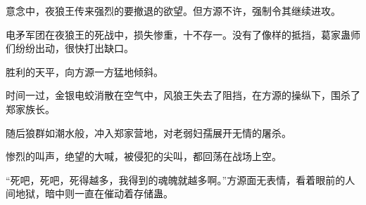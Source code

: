 \begin{this_body}
意念中，夜狼王传来强烈的要撤退的欲望。但方源不许，强制令其继续进攻。

电矛军团在夜狼王的死战中，损失惨重，十不存一。没有了像样的抵挡，葛家蛊师们纷纷出动，很快打出缺口。

胜利的天平，向方源一方猛地倾斜。

时间一过，金银电蛟消散在空气中，风狼王失去了阻挡，在方源的操纵下，围杀了郑家族长。

随后狼群如潮水般，冲入郑家营地，对老弱妇孺展开无情的屠杀。

惨烈的叫声，绝望的大喊，被侵犯的尖叫，都回荡在战场上空。

“死吧，死吧，死得越多，我得到的魂魄就越多啊。”方源面无表情，看着眼前的人间地狱，暗中则一直在催动着存储蛊。

\end{this_body}

